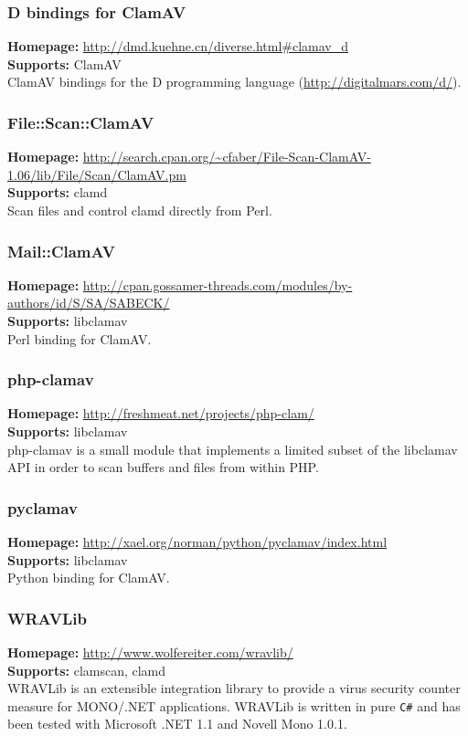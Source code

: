 \documentclass[a4paper,titlepage,12pt]{article}
\begin{document}
    \subsubsection{D bindings for ClamAV}
    \textbf{Homepage:} \url{http://dmd.kuehne.cn/diverse.html#clamav_d}\\
    \textbf{Supports:} ClamAV\\[4pt]
    ClamAV bindings for the D programming language
    (\url{http://digitalmars.com/d/}).

    \subsubsection{File::Scan::ClamAV}
    \textbf{Homepage:} \url{http://search.cpan.org/~cfaber/File-Scan-ClamAV-1.06/lib/File/Scan/ClamAV.pm}\\
    \textbf{Supports:} clamd\\[4pt]
     Scan files and control clamd directly from Perl.

    \subsubsection{Mail::ClamAV}
    \textbf{Homepage:} \url{http://cpan.gossamer-threads.com/modules/by-authors/id/S/SA/SABECK/}\\
    \textbf{Supports:} libclamav\\[4pt]
    Perl binding for ClamAV.

    \subsubsection{php-clamav}
    \textbf{Homepage:} \url{http://freshmeat.net/projects/php-clam/}\\
    \textbf{Supports:} libclamav\\[4pt]
    php-clamav is a small module that implements a limited subset of the
    libclamav API in order to scan buffers and files from within PHP.

    \subsubsection{pyclamav}
    \textbf{Homepage:} \url{http://xael.org/norman/python/pyclamav/index.html}\\
    \textbf{Supports:} libclamav\\[4pt]
    Python binding for ClamAV.

    \subsubsection{WRAVLib}
    \textbf{Homepage:} \url{http://www.wolfereiter.com/wravlib/}\\
    \textbf{Supports:} clamscan, clamd\\[4pt]
    WRAVLib is an extensible integration library to provide a virus security
    counter measure for MONO/.NET applications. WRAVLib is written in pure
    \verb+C#+ and has been tested with Microsoft .NET 1.1 and Novell Mono 1.0.1.
\end{document}

